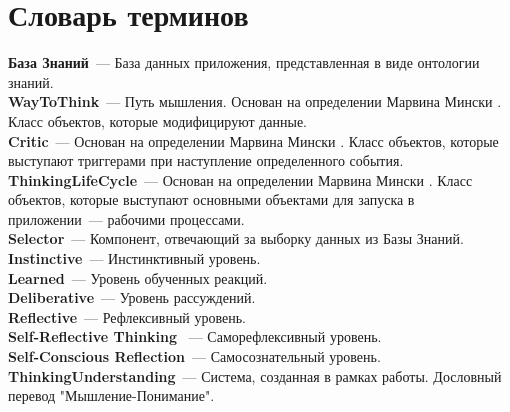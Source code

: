 \chapter*{Словарь терминов}             %

\textbf{База Знаний}~--- База данных приложения, представленная в виде онтологии знаний. \\

\textbf{WayToThink}~--- Путь мышления. Основан на определении Марвина Мински \cite{EmotionMachine}. Класс объектов, которые модифицируют данные. \\

\textbf{Critic}~--- Основан на определении Марвина Мински \cite{EmotionMachine}. Класс объектов, которые выступают триггерами при наступление определенного события. \\

\textbf{ThinkingLifeCycle}~--- Основан на определении Марвина Мински \cite{EmotionMachine}. Класс объектов, которые выступают основными объектами для запуска в приложении~--- рабочими процессами. \\

\textbf{Selector}~--- Компонент, отвечающий за выборку данных из Базы Знаний. \\

\textbf{Instinctive}~--- Инстинктивный уровень. \\

\textbf{Learned}~--- Уровень обученных реакций. \\

\textbf{Deliberative}~--- Уровень рассуждений. \\

\textbf{Reflective}~--- Рефлексивный уровень. \\

\textbf{Self-Reflective Thinking	}~--- Саморефлексивный уровень. \\

\textbf{Self-Conscious Reflection}~--- Самосознательный уровень. \\

\textbf{ThinkingUnderstanding}~--- Система, созданная в рамках работы. Дословный перевод "Мышление-Понимание".\\  

\clearpage